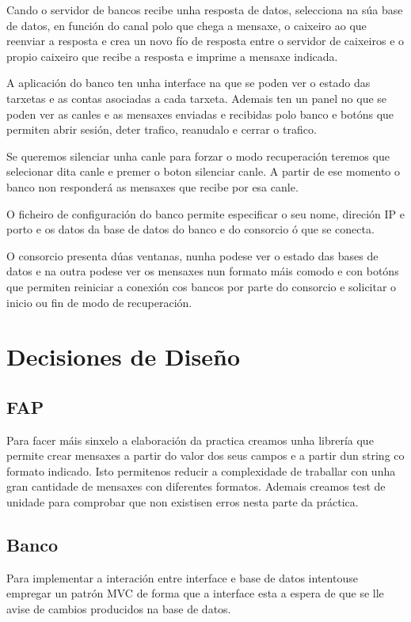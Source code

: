 \documentclass[a4paper,titlepage]{article}
\begin{document}
Cando o servidor de bancos recibe unha resposta de datos, selecciona na súa base de datos, en función do canal polo que chega a mensaxe, o caixeiro ao que reenviar a resposta e crea un novo fío de resposta entre o servidor de caixeiros e o propio caixeiro que recibe a resposta e imprime a mensaxe indicada. 


A aplicación do banco ten unha interface na que se poden ver o estado das tarxetas e as contas asociadas a cada tarxeta. Ademais ten un panel no que se poden ver as canles e as mensaxes enviadas e recibidas polo banco e botóns que permiten abrir sesión, deter trafico, reanudalo e cerrar o trafico.

Se queremos silenciar unha canle para forzar o modo recuperación teremos que selecionar dita canle e premer o boton silenciar canle. A partir de ese momento o banco non responderá as mensaxes que recibe por esa canle.

O ficheiro de configuración do banco permite especificar o seu nome, direción IP e porto e os datos da base de datos do banco e do consorcio ó que se conecta.

O consorcio presenta dúas ventanas, nunha podese ver o estado das bases de datos e na outra podese ver os mensaxes nun formato máis comodo e con botóns que permiten reiniciar a conexión cos bancos por parte do consorcio e solicitar o inicio ou fin de modo de recuperación.


\section{Decisiones de Diseño}
\subsection {FAP}
Para facer máis sinxelo a elaboración da practica creamos unha librería que permite crear mensaxes a partir do valor dos seus campos e a partir dun string co formato indicado. Isto permitenos reducir a complexidade de traballar con unha gran cantidade de mensaxes con diferentes formatos. Ademais creamos test de unidade para comprobar que non existisen erros nesta parte da práctica.

\subsection {Banco}
Para implementar a interación entre interface e base de datos intentouse empregar un patrón MVC de forma que a interface esta a espera de que se lle avise de cambios producidos na base de datos.
\end{document}
